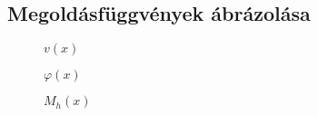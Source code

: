 \documentclass[a4paper, 12pt]{scrartcl}
\begin{document}
\clearpage
\subsection{Megoldásfüggvények ábrázolása} %
\label{sub:Megoldásfüggvények ábrázolása}

\begin{figure}[H]
  \flushright
  
  \hspace{5mm}
  \caption{$v(x)$}
  \label{fig:plot-v}
\end{figure}

\begin{figure}[H]
  \flushright
  
  \hspace{5mm}
  \caption{$\varphi(x)$}
  \label{fig:plot-phi}
\end{figure}

\begin{figure}[H]
  \flushright
  
  \hspace{5mm}
  \caption{$M_h(x)$}
  \label{fig:plot-Mh}
\end{figure}





\end{document}
